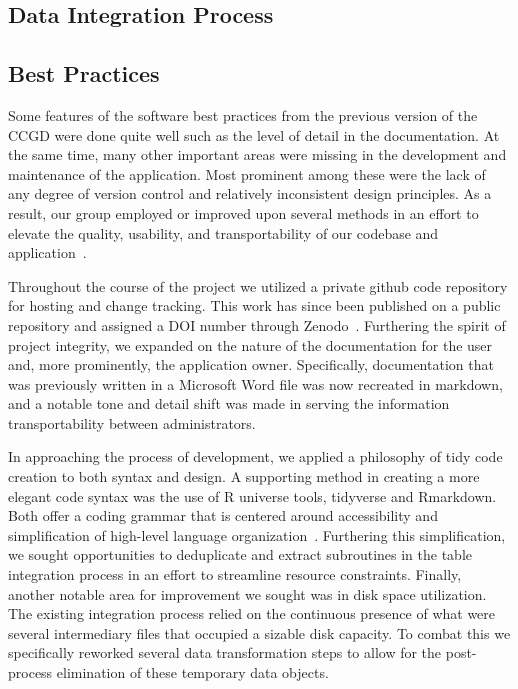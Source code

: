 \documentclass[10pt]{report}
\begin{document}
\subsection{Data Integration Process}

\subsection{Best Practices}
Some features of the software best practices from the previous version of the CCGD were done quite well such as the level of detail in the documentation. At the same time, many other important areas were missing in the development and maintenance of the application. Most prominent among these were the lack of any degree of version control and relatively inconsistent design principles. As a result, our group employed or improved upon several methods in an effort to elevate the quality, usability, and transportability of our codebase and application~\cite{Fincham2011}.

Throughout the course of the project we utilized a private github code repository for hosting and change tracking. This work has since been published on a public repository and assigned a DOI number through Zenodo~\cite{Tastad}. Furthering the spirit of project integrity, we expanded on the nature of the documentation for the user and, more prominently, the application owner. Specifically, documentation that was previously written in a Microsoft Word file was now recreated in markdown, and a notable tone and detail shift was made in serving the information transportability between administrators.

In approaching the process of development, we applied a philosophy of tidy code creation to both syntax and design. A supporting method in creating a more elegant code syntax was the use of R universe tools, tidyverse and Rmarkdown. Both offer a coding grammar that is centered around accessibility and simplification of high-level language organization~\cite{Wickham2019}. Furthering this simplification, we sought opportunities to deduplicate and extract subroutines in the table integration process in an effort to streamline resource constraints. Finally, another notable area for improvement we sought was in disk space utilization. The existing integration process relied on the continuous presence of what were several intermediary files that occupied a sizable disk capacity. To combat this we specifically reworked several data transformation steps to allow for the post-process elimination of these temporary data objects.
\end{document}

